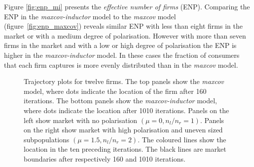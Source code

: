 \documentclass[preprint, 12pt]{elsarticle}
\begin{document}
Figure \ref{fig:enp_mi} presents the \emph{effective number of firms} (ENP). Comparing the ENP in the \emph{maxcov-inductor} model to the \emph{maxcov} model (figure~\ref{fig:enp_maxcov})  reveals similar ENP with less than eight firms in the market or with a medium degree of polarisation. However with more than seven firms in the market and with a low or high degree of polarisation the ENP is higher in the \emph{maxcov-inductor} model. In these cases the fraction of consumers that each firm captures is more evenly distributed than in the \emph{maxcov} model. 

\begin{figure}[hb!]
	\caption{Trajectory plots for twelve firms. The top panels show the \emph{maxcov} model, where dots indicate the location of the firm after 160 iterations. The bottom panels show the \emph{maxcov-inductor} model, where dots indicate the location after 1010 iterations. Panels on the left show market with no polarisation $(\mu=0, n_l/n_r=1)$. Panels on the right show market with high polarisation and uneven sized subpopulations $(\mu=1.5, n_l/n_r=2)$. The coloured lines show the location in the ten preceding iterations. The black lines are market boundaries after respectively 160 and 1010 iterations.}
	\centering
	

\end{figure}
\end{document}
